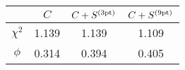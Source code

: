 \renewcommand*{\arraystretch}{1.20}
\begin{tabular}{|c|c|c|c|}
 \toprule
	 &  $C$ & $C+S^{\rm(3pt)}$ & $C+S^{\rm (9pt)}$ \\
\hline
$\chi^2$  & 1.139  & 1.139 & 1.109 	\\
\hline
$\phi$  & 0.314  & 0.394  & 0.405   \\
\bottomrule
\end{tabular}
